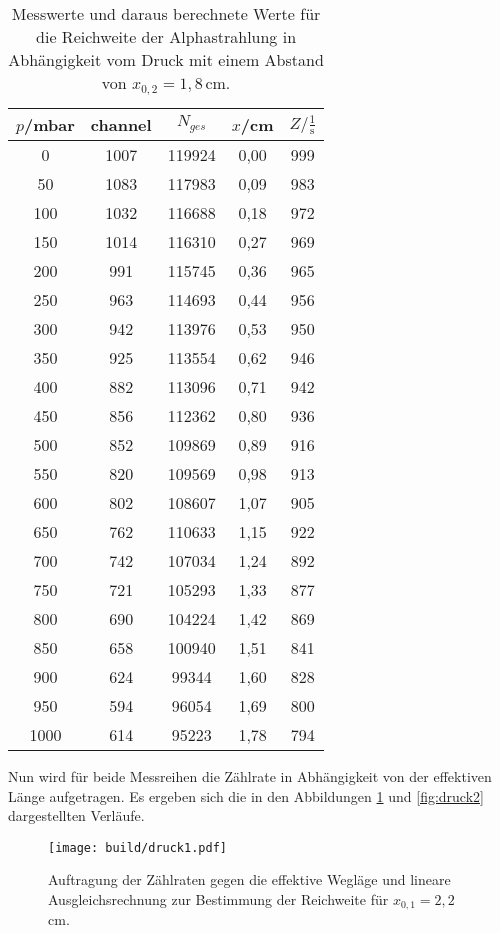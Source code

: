 \begin{table}[htp]
	\begin{center}
    \caption{Messwerte und daraus berechnete Werte für die Reichweite der Alphastrahlung
    in Abhängigkeit vom Druck mit einem Abstand von $x_{0,2}=1{,}8\,$cm.}
    \label{tab:druck2}
		\begin{tabular}{ccccc}
		\toprule
			{$p$/mbar} & {channel} & {$N_{ges}$} & {$x$/cm} & {$Z/\frac{1}{\text{s}}$}\\
			\midrule
			0 & 1007 & 119924 & 0,00 & 999\\
			50 & 1083 & 117983 & 0,09 & 983\\
			100 & 1032 & 116688 & 0,18 & 972\\
			150 & 1014 & 116310 & 0,27 & 969\\
			200 & 991 & 115745 & 0,36 & 965\\
			250 & 963 & 114693 & 0,44 & 956\\
			300 & 942 & 113976 & 0,53 & 950\\
			350 & 925 & 113554 & 0,62 & 946\\
			400 & 882 & 113096 & 0,71 & 942\\
			450 & 856 & 112362 & 0,80 & 936\\
			500 & 852 & 109869 & 0,89 & 916\\
			550 & 820 & 109569 & 0,98 & 913\\
			600 & 802 & 108607 & 1,07 & 905\\
			650 & 762 & 110633 & 1,15 & 922\\
			700 & 742 & 107034 & 1,24 & 892\\
			750 & 721 & 105293 & 1,33 & 877\\
			800 & 690 & 104224 & 1,42 & 869\\
			850 & 658 & 100940 & 1,51 & 841\\
			900 & 624 & 99344 & 1,60 & 828\\
			950 & 594 & 96054 & 1,69 & 800\\
			1000 & 614 & 95223 & 1,78 & 794\\
		\bottomrule
		\end{tabular}
	\end{center}
\end{table}

Nun wird für beide Messreihen die Zählrate in Abhängigkeit von der effektiven Länge
aufgetragen. Es ergeben sich die in den Abbildungen \ref{fig:druck1} und \ref{fig:druck2}
dargestellten Verläufe.

\begin{figure}[H]
  \centering
  \texttt{[image: build/druck1.pdf]}
  \caption{Auftragung der Zählraten gegen die effektive Wegläge und lineare Ausgleichsrechnung
  zur Bestimmung der Reichweite für $x_{0,1}=2{,}2\,$cm.}
  \label{fig:druck1}
\end{figure}

